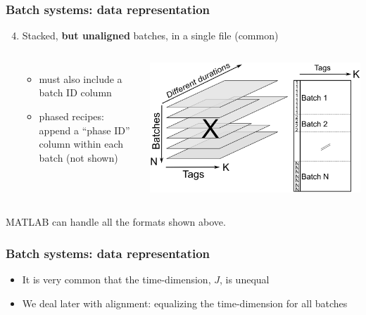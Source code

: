 \documentclass[handout, 12pt]{beamer}
\begin{document}
\begin{frame}\frametitle{Batch systems: data representation}

\begin{enumerate}
	\setcounter{enumi}{3}
	\item	Stacked, \textbf{but unaligned} batches, in a single file (common)
			
			\begin{columns}
					\begin{itemize}
						\item	must also include a batch ID column

						\item	phased recipes: append a ``phase ID'' column within each batch (not shown)
					\end{itemize}
					
				
					\begin{center}
						\includegraphics[width=\textwidth]{images/batch-data-layers-into-page-and-unfolded.png}
					\end{center}
					
			\end{columns}
\end{enumerate}
MATLAB can handle all the formats shown above.
\end{frame}

\begin{frame}\frametitle{Batch systems: data representation}
	
	\begin{itemize}
		\item	It is very common that the time-dimension, \( J \), is unequal	
		
		\item	We deal later with alignment: equalizing the time-dimension for all batches
	\end{itemize}
\end{frame}
\end{document}
